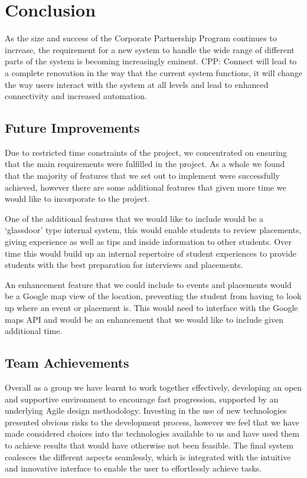 \section{Conclusion}
As the size and success of the Corporate Partnership Program continues to increase, the requirement for a new system to handle the wide range of different parts of the system is becoming increasingly eminent. CPP: Connect will lead to a complete renovation in the way that the current system functions, it will change the way users interact with the system at all levels and lead to enhanced connectivity and increased automation.
	
	\subsection{Future Improvements}
		Due to restricted time constraints of the project, we concentrated on ensuring that the main requirements were fulfilled in the project. As a whole we found that the majority of features that we set out to implement were successfully achieved, however there are some additional features that given more time we would like to incorporate to the project.

		One of the additional features that we would like to include would be a `glassdoor' type internal system, this would enable students to review placements, giving experience as well as tips and inside information to other students. Over time this would build up an internal repertoire of student experiences to provide students with the best preparation for interviews and placements.
		
		An enhancement feature that we could include to events and placements would be a Google map view of the location, preventing the student from having to look up where an event or placement is. This would need to interface with the Google maps API and would be an enhancement that we would like to include given additional time.

	\subsection{Team Achievements}
		Overall as a group we have learnt to work together effectively, developing an open and supportive environment to encourage fast progression, supported by an underlying Agile design methodology.
		Investing in the use of new technologies presented obvious risks to the development process, however we feel that we have made considered choices into the technologies available to us and have used them to achieve results that would have otherwise not been feasible. The final system coalesces the different aspects seamlessly, which is integrated with the intuitive and innovative interface to enable the user to effortlessly achieve tasks.
		

